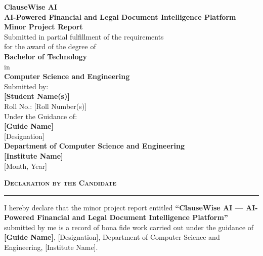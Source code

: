 \documentclass[12pt,a4paper,oneside]{report}
\newcommand{\chaptertitle}[1]{%
  \begin{center}
    \textsc{\Large\textbf{#1}}\\[2pt]
    \rule{0.5\textwidth}{0.5pt}
  \end{center}
}
\begin{document}

\begin{titlepage}
  \centering
  \vspace*{2cm}
  {\LARGE\textbf{ClauseWise AI}}\\[0.5cm]
  {\Large\textbf{AI-Powered Financial and Legal Document Intelligence Platform}}\\[2cm]
  {\large\textbf{Minor Project Report}}\\[0.5cm]
  {\large Submitted in partial fulfillment of the requirements\\
  for the award of the degree of}\\[0.5cm]
  {\large\textbf{Bachelor of Technology}}\\[0.3cm]
  {\large in}\\[0.3cm]
  {\large\textbf{Computer Science and Engineering}}\\[2cm]
  {\large Submitted by:}\\[0.3cm]
  {\large\textbf{[Student Name(s)]}}\\[0.3cm]
  {\large Roll No.: [Roll Number(s)]}\\[2cm]
  {\large Under the Guidance of:}\\[0.3cm]
  {\large\textbf{[Guide Name]}}\\[0.3cm]
  {\large [Designation]}\\[2cm]
  {\large\textbf{Department of Computer Science and Engineering}}\\[0.3cm]
  {\large\textbf{[Institute Name]}}\\[0.3cm]
  {\large [Month, Year]}
  \vfill
\end{titlepage}

\newpage
\chaptertitle{Declaration by the Candidate}

I hereby declare that the minor project report entitled \textbf{``ClauseWise AI --- AI-Powered Financial and Legal Document Intelligence Platform''} submitted by me is a record of bona fide work carried out under the guidance of \textbf{[Guide Name]}, [Designation], Department of Computer Science and Engineering, [Institute Name].
\end{document}
